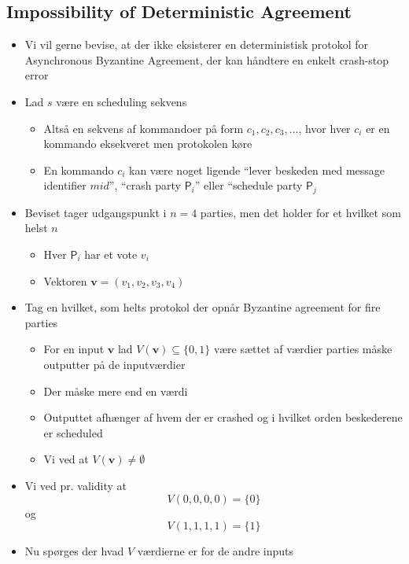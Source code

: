 \documentclass[a4, english]{article}
\begin{document}
\subsection{Impossibility of Deterministic Agreement}
\begin{itemize}
	\item Vi vil gerne bevise, at der ikke eksisterer en deterministisk protokol for Asynchronous Byzantine Agreement, der kan håndtere en enkelt crash-stop error 
  \item Lad $s$ være en scheduling sekvens
  \begin{itemize}
  	\item Altså en sekvens af kommandoer på form $c_1, c_2, c_3, \dots$, hvor hver $c_i$ er en kommando eksekveret men protokolen køre
    \item En kommando $c_i$ kan være noget ligende ``lever beskeden med message identifier $mid$'', ``crash party $\mathsf P_i$'' eller ``schedule party $\mathsf P_j$ 
  \end{itemize}
  \item Beviset tager udgangspunkt i $n=4$ parties, men det holder for et hvilket som helst $n$  
  \begin{itemize}
  	\item Hver $\mathsf P_i$ har et vote $v_i$ 
    \item Vektoren $\pmb v = (v_1, v_2, v_3, v_4)$ 
  \end{itemize}
  \item Tag en hvilket, som helts protokol der opnår Byzantine agreement for fire parties  
  \begin{itemize}
  	\item For en input $\pmb v$ lad $V(\pmb v) \subseteq \{0,1\}$ være sættet af værdier parties måske outputter på de inputværdier  
    \item Der måske mere end en værdi
    \item Outputtet afhænger af hvem der er crashed og i hvilket orden beskederene er scheduled
    \item Vi ved at $V(\pmb v) \ne \emptyset$ 
  \end{itemize}
  \item Vi ved pr. validity at   
  \begin{equation*}
    V(0,0,0,0) = \{0\}
  \end{equation*}
  og
   \begin{equation*}
    V(1,1,1,1) = \{1\}
  \end{equation*}
  \item Nu spørges der hvad $V$ værdierne er for de andre inputs

\end{itemize}
\end{document}
